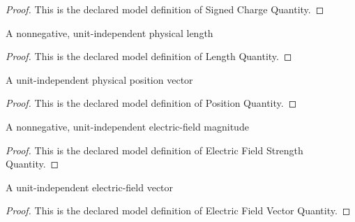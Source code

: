 \begin{proof}
  This is the declared model definition of Signed Charge Quantity.
\end{proof}
\begin{definition}
  \label{def:physics:phyx-mini-0996:phyxminiproblems-problemphyxmini0996-lengthquantity}
  A nonnegative, unit-independent physical length
\end{definition}
\begin{proof}
  This is the declared model definition of Length Quantity.
\end{proof}
\begin{definition}
  \label{def:physics:phyx-mini-0996:phyxminiproblems-problemphyxmini0996-positionquantity}
  A unit-independent physical position vector
\end{definition}
\begin{proof}
  This is the declared model definition of Position Quantity.
\end{proof}
\begin{definition}
  \label{def:physics:phyx-mini-0996:phyxminiproblems-problemphyxmini0996-electricfieldstrengthquantity}
  A nonnegative, unit-independent electric-field magnitude
\end{definition}
\begin{proof}
  This is the declared model definition of Electric Field Strength Quantity.
\end{proof}
\begin{definition}
  \label{def:physics:phyx-mini-0996:phyxminiproblems-problemphyxmini0996-electricfieldvectorquantity}
  A unit-independent electric-field vector
\end{definition}
\begin{proof}
  This is the declared model definition of Electric Field Vector Quantity.
\end{proof}
